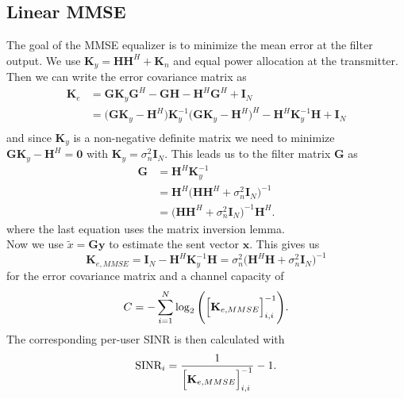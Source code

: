 \subsection{Linear MMSE}
The goal of the MMSE equalizer is to minimize the mean error at the filter output. We use $\mathbf{K}_y = \mathbf{HH}^H + \mathbf{K}_n$ and equal power allocation at the transmitter. Then we can write the error covariance matrix as
\begin{align}
	\mathbf{K}_e &= \mathbf{GK}_y\mathbf{G}^H - \mathbf{GH} - \mathbf{H}^H\mathbf{G}^H + \mathbf{I}_N\\
	&=\Biggr(\mathbf{GK}_y - \mathbf{H}^H\Biggl) \mathbf{K}_y^{-1} \Biggr(\mathbf{GK}_y - \mathbf{H}^H\Biggl)^H - \mathbf{H}^H\mathbf{K}_y^{-1}\mathbf{H}+\mathbf{I}_N\\
\end{align}
and since $\mathbf{K}_y$ is a non-negative definite matrix we need to minimize $\mathbf{GK}_y - \mathbf{H}^H\bigl = \mathbf{0}$
with $\mathbf{K}_y = \sigma_n^2\mathbf{I}_N$. This leads us to the filter matrix $\mathbf{G}$ as
\begin{align}
	\mathbf{G} &= \mathbf{H}^H\mathbf{K}_y^{-1}\\
	&= \mathbf{H}^H\Biggr(\mathbf{HH}^H + \sigma_n^2\mathbf{I}_N\Biggl)^{-1}\\
	&=\Biggr(\mathbf{HH}^H + \sigma_n^2\mathbf{I}_N\Biggl)^{-1}\mathbf{H}^H.
\end{align}
where the last equation uses the matrix inversion lemma.\\
Now we use $\tilde{x} = \mathbf{Gy}$ to estimate the sent vector $\mathbf{x}$. This gives us
\begin{equation}
	\mathbf{K}_{e,MMSE} = \mathbf{I}_N - \mathbf{H}^H\mathbf{K}_y^{-1}\mathbf{H} = \sigma_n^2\Biggr(\mathbf{H}^H\mathbf{H} + \sigma_n^2\mathbf{I}_N\Biggl)^{-1}
\end{equation}
for the error covariance matrix and a channel capacity of
\begin{equation}
	C = -\sum_{i=1}^{N}{\log_2{\Biggr(\Bigr[\mathbf{K}_{e,MMSE}\Bigl]_{i,i}^{-1}\Biggl)}}.
\end{equation}
The corresponding per-user SINR is then calculated with
\begin{equation}
	\text{SINR}_{i} = \frac{1}{\Bigr[\mathbf{K}_{e,MMSE}\Bigl]_{i,i}^{-1}} - 1.
\end{equation}

